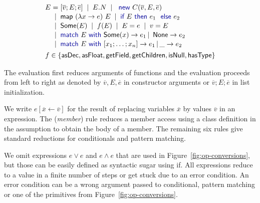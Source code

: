 \documentclass[10pt,preprint,blind,clearpagebib]{sigplanconf}
\newcommand{\kvd}[1]{\textnormal{\textcolor{kvdclr}{\sffamily #1}}}
\newcommand{\ident}[1]{\textnormal{\sffamily #1}}
\newcommand{\lsep}[0]{\;\; | \;\;}
\newcommand{\narrow}[1]{\hspace{-0.7em} #1 \hspace{-0.7em}}
\begin{document}
\vspace{0.5em}
\noindent
\begin{equation*}
\begin{array}{l}
\hspace{-0.5em}
\begin{array}{rcl}
 E &\narrow{=}& [\overline{v};E;\overline{e}] \lsep E.N \lsep \kvd{new}~C(\overline{v}, E, \overline{e})\\[0.1em]
   &\narrow{|}& \ident{map}~(\lambda x\rightarrow e)~E \lsep \kvd{if}~E~\kvd{then}~e_1~\kvd{else}~e_2 \\[0.1em]
   &\narrow{|}& \ident{Some}(E) \lsep f(E) \lsep E = e \lsep v = E \\[0.1em]
   &\narrow{|}& \kvd{match}~E~\kvd{with}~\ident{Some}(x) \rightarrow e_1 \,|\, \ident{None} \rightarrow e_2 \\[0.1em]
   &\narrow{|}& \kvd{match}~E~\kvd{with}~[x_1; \ldots; x_n] \rightarrow e_1 \,|\, \_ \rightarrow e_2
\end{array} \\[3em]
f \in \{ \ident{asDec}, \ident{asFloat}, \ident{getField}, \ident{getChildren}, \ident{isNull}, \ident{hasType} \}
\end{array}
\end{equation*}

\noindent
The evaluation first reduces arguments of functions and the evaluation proceeds from left to right 
as denoted by $\overline{v}, E, \overline{e}$ in constructor arguments or $\overline{v};E;\overline{e}$
in list initialization.

We write $e[\overline{x} \leftarrow \overline{v}]$ for the result of replacing variables $\overline{x}$ by
values $\overline{v}$ in an expression. The (\emph{member}) rule reduces a member access using a class 
definition in the assumption to obtain the body of a member. The remaining six rules
give standard reductions for conditionals and pattern matching.

We omit expressions $e \vee e$ and $e \wedge e$ that are used in Figure~\ref{fig:op-conversions}, 
but those can be easily defined as syntactic sugar using \kvd{if}. All expressions reduce to a value in a 
finite number of steps or get stuck due to an error condition. An error condition can be a wrong 
argument passed to conditional, pattern matching or one of the primitives from Figure~\ref{fig:op-conversions}.

\end{document}
